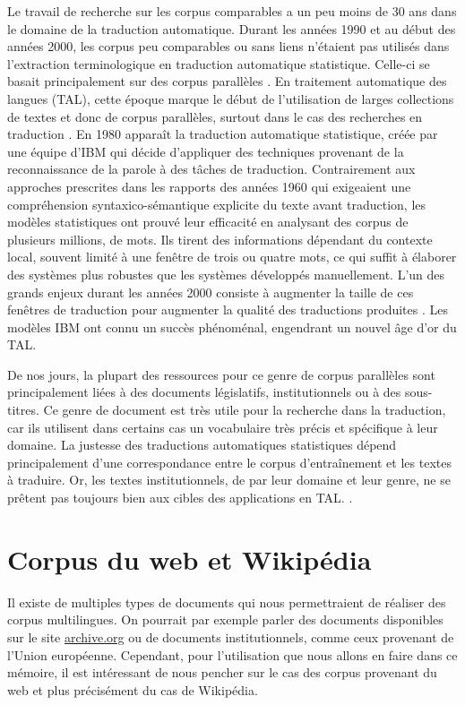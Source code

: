 Le travail de recherche sur les corpus comparables a un peu moins de {30 ans} dans le domaine de la
traduction automatique. Durant les années 1990 et au début des années 2000, les corpus peu comparables ou sans liens n'étaient pas utilisés
dans l'extraction terminologique en traduction automatique statistique. Celle-ci se basait principalement sur des corpus parallèles \citep{sharoff_2013a}.
En traitement automatique des langues (TAL), cette époque marque le début de l'utilisation de larges collections de textes et donc de corpus
parallèles, surtout dans le cas des recherches en traduction \citep{sharoff_2013a}. En 1980 apparaît la traduction automatique statistique,
créée par une équipe d'IBM \citep{brown_1993} qui décide d'appliquer des techniques provenant de la reconnaissance de la parole
à des tâches de traduction. Contrairement aux approches
prescrites dans les rapports des années 1960 qui exigeaient une compréhension syntaxico-sémantique
explicite du texte avant traduction, les modèles statistiques ont prouvé leur efficacité en analysant des corpus de plusieurs millions,
de mots. Ils tirent des informations dépendant du contexte local, souvent limité à une fenêtre de trois ou quatre mots, ce qui suffit à élaborer des
systèmes plus robustes que les systèmes développés manuellement. L'un des grands enjeux durant les années 2000 consiste à augmenter la taille de
ces fenêtres de traduction pour augmenter la qualité des traductions produites \citep{koehn_2009}.
Les modèles IBM ont connu un succès phénoménal, engendrant un nouvel âge d'or du TAL.

De nos jours, la plupart des ressources pour ce genre de corpus parallèles sont principalement
liées à des documents législatifs, institutionnels ou à des sous-titres. Ce genre de document est très utile pour la
recherche dans la traduction, car ils utilisent dans certains cas un vocabulaire très précis et spécifique à
leur domaine. La justesse des traductions automatiques statistiques dépend
principalement d'une correspondance entre le corpus d'entraînement et les textes à traduire. Or, les textes institutionnels,
de par leur domaine et leur genre, ne se prêtent pas toujours bien aux cibles des applications en TAL.
\citep{babych_2007, eisele_2008, sharoff_2013a}.

\section{Corpus du web et Wikipédia}

Il existe de multiples types de documents qui nous permettraient de réaliser des corpus multilingues.
On pourrait par exemple parler des documents disponibles sur le site \href{https://archive.org/}{archive.org}
ou de documents institutionnels, comme ceux provenant de l'Union européenne. Cependant, pour
l'utilisation que nous allons en faire dans ce mémoire, il est intéressant de nous pencher sur le cas des
corpus provenant du web et plus précisément du cas de Wikipédia.

